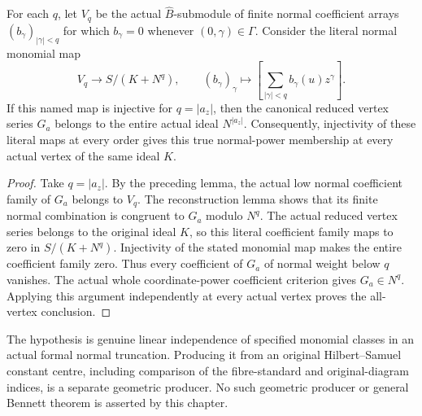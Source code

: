 \begin{theorem}
\label{hir:actual-reduced-normal-support-from-monomial-injectivity}
\leanok
{}
For each $q$, let $V_q$ be the actual $\widehat B$-submodule of finite
normal coefficient arrays $(b_\gamma)_{|\gamma|<q}$ for which
$b_\gamma=0$ whenever $(0,\gamma)\in\Gamma$. Consider the literal
normal monomial map
\[
 V_q\longrightarrow S/(K+N^q),\qquad
 (b_\gamma)_\gamma\longmapsto
 \left[\sum_{|\gamma|<q} b_\gamma(u)z^\gamma\right].
\]
If this named map is injective for $q=|a_z|$, then the canonical
reduced vertex series $G_a$ belongs to the entire actual ideal
$N^{|a_z|}$. Consequently, injectivity of these literal maps at
every order gives this true normal-power membership at every actual
vertex of the same ideal $K$.
\end{theorem}
\begin{proof}
Take $q=|a_z|$. By the preceding lemma, the actual low normal
coefficient family of $G_a$ belongs to $V_q$. The reconstruction lemma
shows that its finite normal combination is congruent to $G_a$ modulo
$N^q$. The actual reduced vertex series belongs to the original ideal
$K$, so this literal coefficient family maps to zero in $S/(K+N^q)$.
Injectivity of the stated monomial map makes the entire coefficient
family zero. Thus every coefficient of $G_a$ of normal weight below
$q$ vanishes. The actual whole coordinate-power coefficient criterion
gives $G_a\in N^q$. Applying this argument independently at every
actual vertex proves the all-vertex conclusion.
\end{proof}

The hypothesis is genuine linear independence of specified monomial
classes in an actual formal normal truncation. Producing it from an
original Hilbert--Samuel constant centre, including comparison of the
fibre-standard and original-diagram indices, is a separate geometric
producer. No such geometric producer or general Bennett theorem is
asserted by this chapter.
